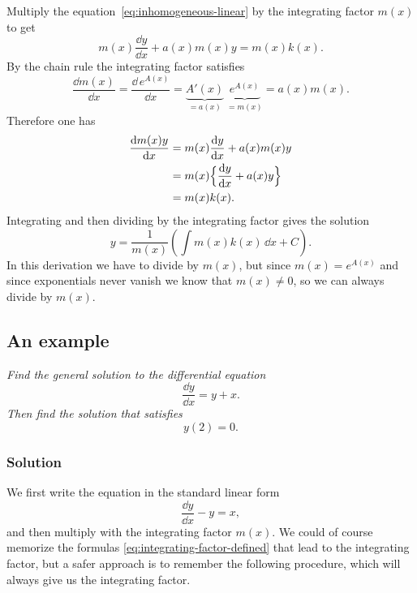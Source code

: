 Multiply the equation~\eqref{eq:inhomogeneous-linear} by the integrating factor
$m(x)$ to get
\[
m(x)\frac{\dd y}{\dd x}+a(x)m(x)y = m(x)k(x).
\]
By the chain rule the integrating factor satisfies
\[
\frac{\dd m(x)}{\dd x} = \frac{\dd\,
  e^{A(x)}} {\dd x}
= \underbrace{A'(x)}_{=a(x)} ~\underbrace{e^{A(x)}_{}}_{=m(x)}
= a(x)m(x).
\]
Therefore one has
\begin{align*}
  \frac{\mathrm{d} m(x)y}{\mathrm{d} x}
  &= m(x)\frac{\mathrm{d} y}{\mathrm{d} x}+a(x)m(x)y \\
  &= m(x)\Bigl\{\frac{\mathrm{d} y}{\mathrm{d} x}+a(x)y \Bigr\}\\
  &= m(x)k(x).
\end{align*}
Integrating and then dividing by the integrating factor gives the solution
\[
y=\frac1{m(x)}\left(\int m(x)k(x)\,\dd x+C\right).
\]
In this derivation we have to divide by $m(x)$, but since $m(x)=e^{A (x)}$ and since
exponentials never vanish we know that $m (x)\neq0$, so we can always divide by $m
(x)$.


\subsection{An example} %
\label{sec:an-example}\itshape%
Find the general solution to the differential equation
\[
\frac{\dd y} {\dd x} = y + x.
\]
Then find the solution that satisfies \upshape
\begin{equation}
  y(2)=0.
  \label{eq:example-linear-initial-condition}
\end{equation}
\subsubsection*{Solution}
We first write the equation in the standard linear form
\begin{equation}
  \label{eq:diffeq-linear-example}
  \frac{\dd y} {\dd x} - y = x,
\end{equation}
and then multiply with the integrating factor $m(x)$.  We could of course memorize
the formulas \eqref{eq:integrating-factor-defined} that lead to the integrating
factor, but a safer approach is to remember the following procedure, which will
always give us the integrating factor.

